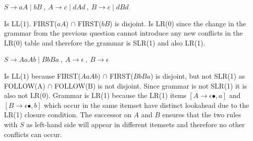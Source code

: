 \documentclass[12pt]{article}
\begin{document}
\begin{exe}
\begin{xlist}
    {\ex \( S \rightarrow aA \mid bB\ ,\ A \rightarrow c \mid dAd\ ,\
      B \rightarrow c \mid dBd \) 
      \begin{soln}
        Is LL($1$). FIRST($aA$) $\cap$ FIRST($bB$) is disjoint. Is
        LR(0) since the change in the grammar from the previous
        question cannot introduce any new conflicts in the LR(0)
        table and therefore the grammar is SLR(1) and also LR(1).
      \end{soln}
    }

    {\ex \( S \rightarrow AaAb \mid BbBa\ ,\ A \rightarrow \epsilon\
      ,\ B \rightarrow \epsilon \) 
      \begin{soln}
        Is LL($1$) because FIRST($AaAb$) $\cap$ FIRST($BbBa$) is
        disjoint, but not SLR(1) as FOLLOW(A) $\cap$ FOLLOW(B) is not
        disjoint. Since grammar is not SLR(1) it is also not LR(0).
        Grammar is LR(1) because the LR(1) items
        $[ A \rightarrow \epsilon \bullet, a]$ and 
        $[ B \rightarrow \epsilon \bullet, b]$
        which occur in the same itemset have distinct lookahead
        due to the LR(1) closure condition. The successor on $A$
        and $B$ ensures that the two rules with $S$ as left-hand
        side will appear in different itemsets and therefore no
        other conflicts can occur.
      \end{soln}
    }

  \end{xlist}


\newpage

\end{exe}
\end{document}
